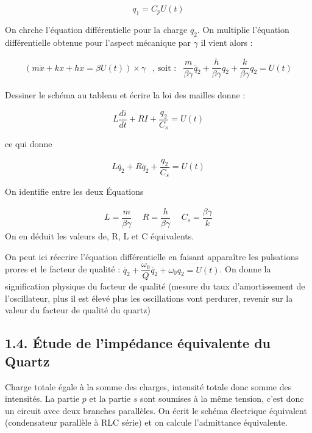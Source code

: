 \documentclass[french, a4paper, 10pt, twocolumn, landscape]{article}
\begin{document}
$$q_1=C_pU(t)$$

On chrche l'équation différentielle pour la charge $q_2$. On multiplie l'équation différentielle obtenue pour l'aspect mécanique par $\gamma$ il vient alors : 

\begin{equation}
    \begin{array}{lll}
    \left(m\ddot{x}+kx+h\dot{x}=\beta U(t)\right)\times \gamma&\text{, soit :}& \dfrac{m}{\beta\gamma}\ddot{q_2}+\dfrac{h}{\beta\gamma}\dot{q_2}+\dfrac{k}{\beta\gamma}q_2=U(t)
\end{array}
\end{equation}

Dessiner le schéma au tableau et écrire la loi des mailles donne :

\begin{equation}
    L\dfrac{di}{dt}+RI+\dfrac{q_2}{C_s}=U(t)
\end{equation}

ce qui donne 

\begin{equation}
    L\ddot{q_2}+R\dot{q_2}+\dfrac{q_2}{C_s}=U(t)
\end{equation}

On identifie entre les deux Équations

\begin{equation}
    \begin{array}{lll}
        
    L = \dfrac{m}{\beta\gamma}&~~ R=\dfrac{h}{\beta\gamma}&~~C_s=\dfrac{\beta\gamma}{k} 
    \end{array}
\end{equation}
On en déduit les valeurs de, R, L et C équivalents.


On peut ici réecrire l'équation différentielle en faisant apparaître les pulsations prores et le facteur de qualité : $\ddot{q_2}+\dfrac{\omega_0}{Q}\dot{q_2}+\omega_0q_2=U(t)$.  On donne la signification physique du facteur de qualité (mesure du taux d'amortissement de l'oscillateur, plus il est élevé plus les oscillations vont perdurer, revenir sur la valeur du facteur de qualité du quartz)
\subsection*{1.4. Étude de l'impédance équivalente du Quartz}

Charge totale égale à la somme des charges, intensité totale donc somme des intensités. La partie $p$ et la partie $s$ sont soumises à la même tension, c'est donc un circuit avec deux branches parallèles. On écrit le schéma électrique équivalent (condensateur parallèle à RLC série) et on calcule l'admittance équivalente.\medskip
\end{document}
